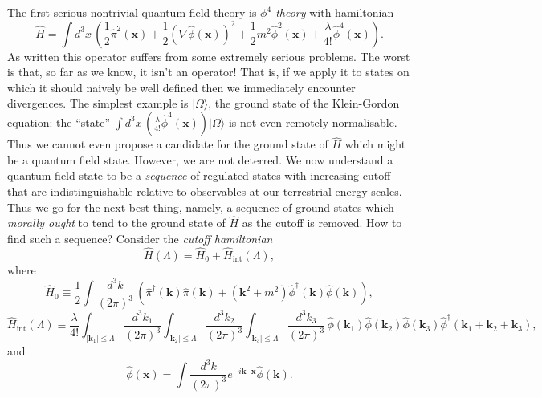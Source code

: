 \documentclass[11pt]{amsart}
\theoremstyle{plain}%
\theoremstyle{definition}
\theoremstyle{remark}
\begin{document}
The first serious nontrivial quantum field theory is \emph{$\phi^4$ theory} with hamiltonian
\begin{equation}
	\widehat{H} = \int d^3 {x}\, \left(\frac12\widehat{\pi}^2(\mathbf{x}) + \frac12(\nabla \widehat{\phi}(\mathbf{x}))^2 + \frac12m^2 \widehat{\phi}^2(\mathbf{x}) + \frac{\lambda}{4!}\widehat{\phi}^4(\mathbf{x})\right).
\end{equation}
As written this operator suffers from some extremely serious problems. The worst is that, so far as we know, it isn't an operator! That is, if we apply it to states on which it should naively be well defined then we immediately encounter divergences. The simplest example is $|\Omega\rangle$, the ground state of the Klein-Gordon equation: the ``state'' $\int d^3 {x}\, \left(\frac{\lambda}{4!}\widehat{\phi}^4(\mathbf{x})\right) |\Omega\rangle$ is not even remotely normalisable. Thus we cannot even propose a candidate for the ground state of $\widehat{H}$ which might be a quantum field state. However, we are not deterred. We now understand a quantum field state to be a \emph{sequence} of regulated states with increasing cutoff that are indistinguishable relative to observables at our terrestrial energy scales. Thus we go for the next best thing, namely, a sequence of ground states which \emph{morally ought} to tend to the ground state of $\widehat{H}$ as the cutoff is removed. How to find such a sequence? Consider the \emph{cutoff hamiltonian} 
\begin{equation}
	\widehat{H}(\Lambda) = \widehat{H}_0  + \widehat{H}_{\text{int}}(\Lambda),
\end{equation}
where
\begin{equation}
	\widehat{H}_0 \equiv \frac{1}{2}\int \frac{d^3 {k}}{(2\pi)^3}\, \left(\widehat{\pi}^\dag(\mathbf{k})\widehat{\pi}(\mathbf{k}) + (\mathbf{k}^2 + m^2)\widehat{\phi}^\dag(\mathbf{k})\widehat{\phi}(\mathbf{k})\right),
\end{equation}
\begin{equation}
	\widehat{H}_{\text{int}}(\Lambda) \equiv  \frac{\lambda}{4!}\int_{|\mathbf{k}_1| \le \Lambda} \frac{d^3 {k}_1}{(2\pi)^3}\int_{|\mathbf{k}_2| \le \Lambda} \frac{d^3 {k}_2}{(2\pi)^3}\int_{|\mathbf{k}_3| \le \Lambda} \frac{d^3 {k}_3}{(2\pi)^3}\, \widehat{\phi}(\mathbf{k}_1)\widehat{\phi}(\mathbf{k}_2)\widehat{\phi}(\mathbf{k}_3)\widehat{\phi}^\dag(\mathbf{k}_1+\mathbf{k}_2+\mathbf{k}_3),
\end{equation}
and
\begin{equation}
	\widehat{\phi}(\mathbf{x}) = \int \frac{d^3 {k}}{(2\pi)^{3}} e^{-i\mathbf{k}\cdot \mathbf{x}} \widehat{\phi}(\mathbf{k}).
\end{equation}
\end{document}
